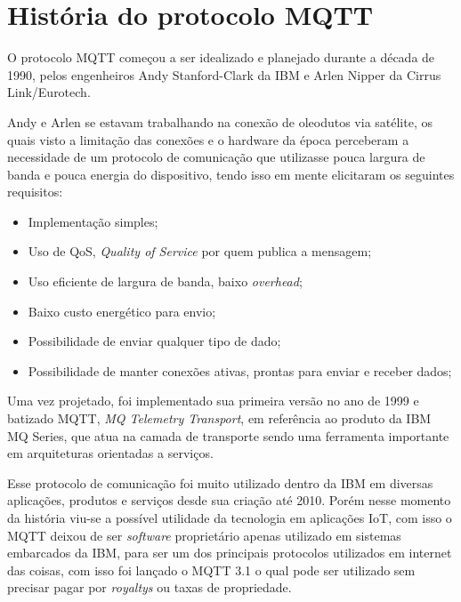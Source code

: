 \documentclass[12pt, a4paper]{article}
\begin{document}
\cleardoublepage

\section{História do protocolo MQTT}

O protocolo MQTT começou a ser idealizado e planejado durante a década de 1990\cite{historia_breve_resumo_mqtt}, pelos engenheiros Andy Stanford-Clark da IBM e Arlen Nipper da Cirrus Link/Eurotech\cite{historia_introduction_mqtt}.

Andy e Arlen se estavam trabalhando na conexão de oleodutos via satélite, os quais visto a limitação das conexões e o hardware da época perceberam a necessidade de um protocolo de comunicação que utilizasse pouca largura de banda e pouca energia do dispositivo, tendo isso em mente elicitaram os seguintes requisitos\cite{historia_introduction_mqtt}:

\begin{itemize}
    \item Implementação simples;
    \item Uso de QoS, \textit{Quality of Service} por quem publica a mensagem;
    \item Uso eficiente de largura de banda, baixo \textit{overhead};
    \item Baixo custo energético para envio;
    \item Possibilidade de enviar qualquer tipo de dado;
    \item Possibilidade de manter conexões ativas, prontas para enviar e receber dados;
\end{itemize}

Uma vez projetado, foi implementado sua primeira versão no ano de 1999 e batizado MQTT, \textit{MQ Telemetry Transport}, em referência ao produto da IBM MQ Series, que atua na camada de transporte sendo uma ferramenta importante em arquiteturas orientadas a serviços\cite{historia_ibm_mq}.

Esse protocolo de comunicação foi muito utilizado dentro da IBM em diversas aplicações, produtos e serviços desde sua criação até 2010\cite{historia_introduction_mqtt}. Porém nesse momento da história viu-se a possível utilidade da tecnologia em aplicações IoT, com isso o MQTT deixou de ser \textit{software} proprietário apenas utilizado em sistemas embarcados da IBM, para ser um dos principais protocolos utilizados em internet das coisas, com isso foi lançado o MQTT 3.1 o qual pode ser utilizado sem precisar pagar por \textit{royaltys} ou taxas de propriedade.
\end{document}
